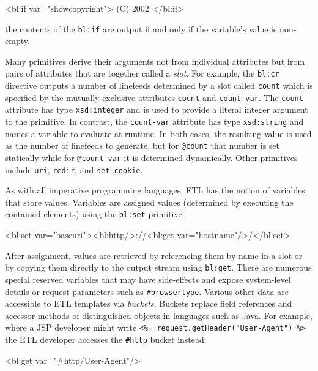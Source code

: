 \documentclass{www2003-submission}
\newcommand{\smtexttt}[1]{{\small\texttt{#1}}}
\newcommand{\etl}{ETL}
\newenvironment{smallverbatim}%
{\renewcommand{\baselinestretch}{1}\small\verbatim}%
{\renewcommand{\baselinestretch}{2}\endverbatim}
\begin{document}
\begin{smallverbatim}
<bl:if var="showcopyright"> (C) 2002 </bl:if>
\end{smallverbatim}

\noindent the contents of the \smtexttt{bl:if} are output if and
only if the variable's value is non-empty.

Many primitives derive their arguments not from individual attributes
but from pairs of attributes that are together called a \emph{slot}.
For example, the \smtexttt{bl:cr} directive outputs a number of
linefeeds determined by a slot called \smtexttt{count} 
which is specified by the mutually-exclusive attributes \smtexttt{count} and
\smtexttt{count-var}.  The \smtexttt{count} attribute has type
\smtexttt{xsd:integer} and is used to provide a literal integer
argument to the primitive.  In contrast, the \smtexttt{count-var}
attribute has type \smtexttt{xsd:string} and names a variable to
evaluate at runtime.  In both cases, the resulting value is used as
the number of linefeeds to generate, but for \smtexttt{@count} that
number is set statically while for \smtexttt{@count-var} it is
determined dynamically.  Other primitives include \smtexttt{uri},
\smtexttt{redir}, and \smtexttt{set-cookie}.

As with all imperative programming languages, \etl{} has the notion of
variables that store values. Variables are assigned values (determined
by executing the contained elements) using the
\smtexttt{bl:set} primitive:

\begin{smallverbatim}
<bl:set var="baseuri"><bl:http/>://<bl:get
 var="hostname"/>/</bl:set>
\end{smallverbatim}

After assignment, values are retrieved by referencing them by name in
a slot or by copying them directly to the output stream using
\smtexttt{bl:get}.  There are numerous special reserved variables that may have
side-effects and expose system-level details or request parameters such as \smtexttt{\#browsertype}.
Various other data are accessible to \etl{} templates via
\emph{buckets}. Buckets replace field references and accessor methods of
distinguished objects in languages such as Java.  For example, where a
JSP developer might write \smtexttt{<\%= request.getHeader("User-Agent") \%>}
the \etl{} developer accesses the \smtexttt{\#http}
bucket instead:

\begin{smallverbatim}
<bl:get var="#http/User-Agent"/>
\end{smallverbatim}
\end{document}
